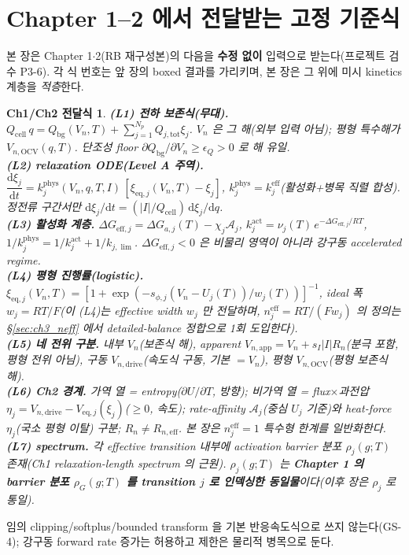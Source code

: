 \documentclass[11pt,a4paper]{article}
\newtheorem*{linkbox}{Ch1/Ch2 전달식}
\newcommand{\dd}{\mathrm{d}}
\newcommand{\eff}{\mathrm{eff}}
\newcommand{\eq}{\mathrm{eq}}
\newcommand{\app}{\mathrm{app}}
\newcommand{\drive}{\mathrm{drive}}
\newcommand{\bg}{\mathrm{bg}}
\newcommand{\cell}{\mathrm{cell}}
\newcommand{\OCV}{\mathrm{OCV}}
\newcommand{\tot}{\mathrm{tot}}
\begin{document}
\section{Chapter 1--2 에서 전달받는 고정 기준식}\label{sec:ch3_inherit}
본 장은 Chapter 1$\cdot$2(RB 재구성본)의 다음을 \textbf{수정 없이} 입력으로 받는다(프로젝트 검수 P3-6). 각 식
번호는 앞 장의 boxed 결과를 가리키며, 본 장은 그 위에 미시 kinetics 계층을 \emph{적층}한다.
\begin{linkbox}
\textbf{(L1) 전하 보존식(무대).} $Q_\cell\,q=Q_\bg(V_n,T)+\sum_{j=1}^{N_p}Q_{j,\tot}\xi_j$. $V_n$ 은 그 해(외부
입력 아님); 평형 특수해가 $V_{n,\OCV}(q,T)$. 단조성 floor $\partial Q_\bg/\partial V_n\ge\epsilon_Q>0$ 로 해 유일.\\
\textbf{(L2) relaxation ODE(Level A 주역).} $\dfrac{\dd\xi_j}{\dd t}=k_j^{\mathrm{phys}}(V_n,q,T,I)\,[\xi_{\eq,j}(V_n,T)-\xi_j]$,
$k_j^{\mathrm{phys}}=k_j^{\eff}$(활성화+병목 직렬 합성). 정전류 구간서만 $\dd\xi_j/\dd t=(|I|/Q_\cell)\,\dd\xi_j/\dd q$.\\
\textbf{(L3) 활성화 계층.} $\Delta G_{\eff,j}=\Delta G_{a,j}(T)-\chi_j\mathcal A_j$,
$k_j^{\mathrm{act}}=\nu_j(T)\,e^{-\Delta G_{\eff,j}/RT}$, $1/k_j^{\mathrm{phys}}=1/k_j^{\mathrm{act}}+1/k_{j,\lim}$.
$\Delta G_{\eff,j}<0$ 은 비물리 영역이 아니라 강구동 accelerated regime.\\
\textbf{(L4) 평형 진행률(logistic).} $\xi_{\eq,j}(V_n,T)=[1+\exp(-s_{\phi,j}(V_n-U_j(T))/w_j(T))]^{-1}$, ideal
폭 $w_j=RT/F$(이 (L4)는 effective width $w_j$ 만 전달하며, $n_j^{\eff}=RT/(Fw_j)$ 의 \emph{정의}는 \S\ref{sec:ch3_neff}
에서 detailed-balance 정합으로 1회 도입한다).\\
\textbf{(L5) 네 전위 구분.} 내부 $V_n$(보존식 해), apparent $V_{n,\app}=V_n+s_I|I|R_n$(분극 포함, 평형 전위
아님), 구동 $V_{n,\drive}$(속도식 구동, 기본 $=V_n$), 평형 $V_{n,\OCV}$(평형 보존식 해).\\
\textbf{(L6) Ch2 경계.} 가역 열 = entropy($\partial U/\partial T$, 방향); 비가역 열 = flux$\times$과전압
$\eta_j=V_{n,\drive}-V_{\eq,j}(\xi_j)$($\ge0$, 속도); rate-affinity $\mathcal A_j$(중심 $U_j$ 기준)와
heat-force $\eta_j$(국소 평형 이탈) 구분; $R_n\ne R_{n,\eff}$. 본 장은 $n_j^{\eff}=1$ 특수형 한계를 일반화한다.\\
\textbf{(L7) spectrum.} 각 effective transition 내부에 activation barrier 분포 $\rho_j(g;T)$ 존재(Ch1
relaxation-length spectrum 의 근원). $\rho_j(g;T)$ 는 \textbf{Chapter 1 의 barrier 분포 $\rho_G(g;T)$ 를
transition $j$ 로 인덱싱한 동일물}이다(이후 장은 $\rho_j$ 로 통일).
\end{linkbox}
임의 clipping/softplus/bounded transform 을 기본 반응속도식으로 쓰지 않는다(GS-4); 강구동 forward rate 증가는
허용하고 제한은 물리적 병목으로 둔다.
\end{document}
